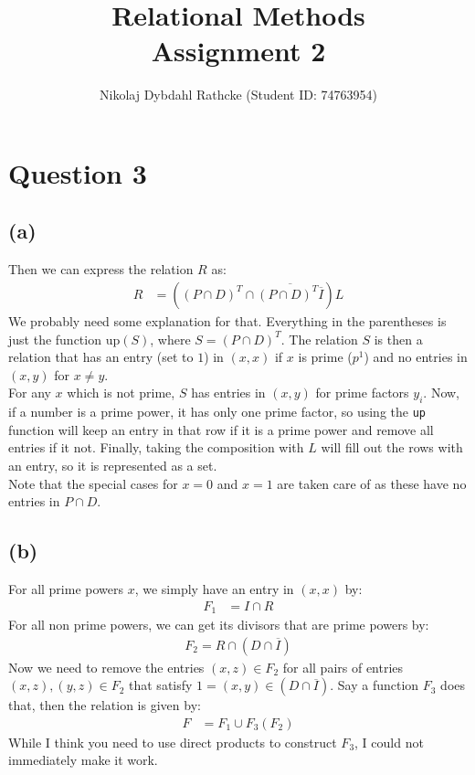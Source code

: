 \documentclass[a4paper, fleqn]{article}
\author{Nikolaj Dybdahl Rathcke (Student ID: 74763954)}
\title{Relational Methods \\ Assignment 2}
\begin{document}
\maketitle

\section*{Question 3}
\subsection*{(a)}
Then we can express the relation $R$ as:
\begin{align*}
  R&=\left((P\cap D)^T\cap \overline{\left(P\cap D\right)^T\overline{I}}\right)L
\end{align*}
We probably need some explanation for that. Everything in the parentheses is just the
function $\mbox{up}(S)$, where $S=(P\cap D)^T$. The relation $S$ is then a relation that
has an entry (set to $1$) in $(x,x)$ if $x$ is prime ($p^1$) and no entries in $(x,y)$
for $x\neq y$. \\
For any $x$ which is not prime, $S$ has entries in $(x,y)$ for prime factors $y_i$. Now, if a number is a prime power, it has only one prime factor, so using the
\texttt{up} function will keep an entry in that row if it is a prime power and remove all
entries if it not. Finally, taking the composition with $L$ will fill out the rows with an
entry, so it is represented as a set. \\
Note that the special cases for $x=0$ and $x=1$ are taken care of as these have no entries in
$P\cap D$.

\subsection*{(b)}
For all prime powers $x$, we simply have an entry in $(x,x)$ by:
\begin{align*}
  F_1&=I\cap R
\end{align*}
For all non prime powers, we can get its divisors that are prime powers by:
\begin{align*}
  F_2=R\cap (D\cap \overline{I})
\end{align*}
Now we need to remove the entries $(x,z)\in F_2$ for all pairs of entries $(x,z),(y,z)\in
F_2$ that satisfy $1=(x,y)\in (D\cap \overline{I})$. Say a function $F_3$ does that, then
the relation is given by:
\begin{align*}
  F &= F_1\cup F_3(F_2)
\end{align*}
While I think you need to use direct products to construct $F_3$, I could not immediately
make it work.
\end{document}
